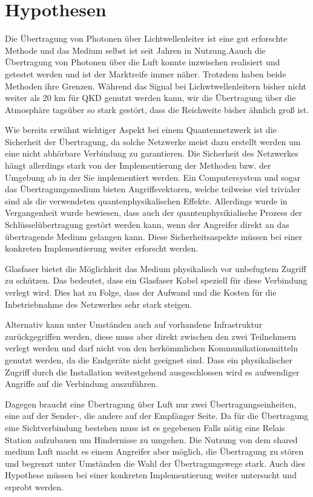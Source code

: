 \chapter{Hypothesen}

Die Übertragung von Photonen über Lichtwellenleiter ist eine gut erforschte Methode und das Medium selbst ist seit Jahren in Nutzung.Aauch die Übertragung von Photonen über die Luft konnte inzwischen realisiert und getestet werden und ist der Marktreife immer näher.
Trotzdem haben beide Methoden ihre Grenzen. Während das Signal bei Lichwtwellenleitern bisher nicht weiter als 20 km für \ac{QKD} genutzt werden kann, wir die Übertragung über die Atmosphäre tagsüber so stark gestört, dass die Reichweite bisher ähnlich groß ist.

Wie bereits erwähnt wichtiger Aspekt bei einem Quantennetzwerk ist die Sicherheit der Übertragung, da solche Netzwerke meist dazu erstellt werden um eine nicht abhörbare Verbindung zu garantieren.
Die Sicherheit des Netzwerkes hängt allerdings stark von der Implementierung der Methoden bzw. der Umgebung ab in der Sie implementiert werden. Ein Computersystem und sogar das Übertragungsmedium bieten Angriffsvektoren, welche teilweise viel trivialer sind als die verwendeten quantenphysikalischen Effekte.
Allerdings wurde in Vergangenheit wurde bewiesen, dass auch der quantenphysikialische Prozess der Schlüsselübertragung gestört werden kann, wenn der Angreifer direkt an das übertragende Medium gelangen kann\cite{Fei2018QuantumMA}. Diese Sicherheitsaspekte müssen bei einer konkreten Implementierung weiter erforscht werden.

Glasfaser bietet die Möglichkeit das Medium physikalisch vor unbefugtem Zugriff zu schützen.
Das bedeutet, dass ein Glasfaser Kabel speziell für diese Verbindung verlegt wird.
Dies hat zu Folge, dass der Aufwand und die Kosten für die Inbetriebnahme des Netzwerkes sehr stark steigen.

Alternativ kann unter Umständen auch auf vorhandene Infrastruktur zurückgegriffen werden, diese muss aber direkt zwischen den zwei Teilnehmern verlegt werden und darf nicht von den herkömmlichen Kommunikationsmitteln genutzt werden, da die Endgeräte nicht geeignet sind.
Dass ein physikalischer Zugriff durch die Installation weitestgehend ausgeschlossen wird es aufwendiger Angriffe auf die Verbindung auszuführen.

Dagegen braucht eine Übertragung über Luft nur zwei Übertragungseinheiten, eine auf der Sender-, die andere auf der Empfänger Seite.
Da für die Übertragung eine Sichtverbindung bestehen muss ist es gegebenen Falls nötig eine Relais Station aufzubauen um Hindernisse zu umgehen.
Die Nutzung von dem shared medium Luft macht es einem Angreifer aber möglich, die Übertragung zu stören und begrenzt unter Umständen die Wahl der Übertragungswege stark. Auch dies Hypothese müssen bei einer konkreten Implementierung weiter untersucht und erprobt werden.

